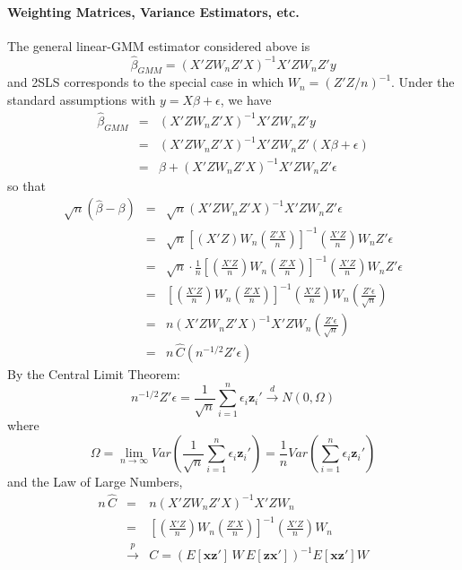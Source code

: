 \documentclass[12pt]{article}
\theoremstyle{definition}
\begin{document}
\paragraph{Weighting Matrices, Variance Estimators, etc.}
The general linear-GMM estimator considered above is 
  $$\widehat{\beta}_{GMM} = (X'Z W_n Z'X)^{-1}X'Z W_n Z'y$$
and 2SLS corresponds to the special case in which $W_n = (Z'Z/n)^{-1}$. Under the standard assumptions with $y = X\beta + \epsilon$, we have
\begin{eqnarray*}
  \widehat{\beta}_{GMM} &=& (X'Z W_n Z'X)^{-1}X'Z W_n Z'y\\
      &=& (X'Z W_n Z'X)^{-1}X'Z W_n Z'(X\beta + \epsilon)\\
      &=&\beta + (X'Z W_n Z'X)^{-1}X'Z W_n Z'\epsilon
\end{eqnarray*}
so that 
\begin{eqnarray*}
  \sqrt{n} \left(\widehat{\beta} - \beta\right) &=& \sqrt{n} (X'Z W_n Z'X)^{-1}X'Z W_n Z'\epsilon\\
    &=& \sqrt{n} \left[\left(X'Z\right) W_n \left(\frac{Z'X}{n} \right) \right]^{-1} \left(\frac{X'Z}{n} \right) W_n Z'\epsilon\\
    &=& \sqrt{n} \cdot \frac{1}{n} \left[\left(\frac{X'Z}{n}\right) W_n \left(\frac{Z'X}{n} \right) \right]^{-1} \left(\frac{X'Z}{n} \right)W_n Z'\epsilon\\
    &=& \left[\left(\frac{X'Z}{n}\right) W_n \left(\frac{Z'X}{n} \right) \right]^{-1} \left(\frac{X'Z}{n} \right)W_n\left(\frac{Z'\epsilon}{\sqrt{n}}\right)\\
    &=& n \left(X'Z W_n Z'X\right)^{-1} X'Z W_n\left(\frac{Z'\epsilon}{\sqrt{n}}\right) \\
    &=& n\,\widehat{C}\left( n^{-1/2} Z'\epsilon\right)
\end{eqnarray*}
By the Central Limit Theorem:
  $$n^{-1/2} Z'\epsilon = \frac{1}{\sqrt{n}} \sum_{i=1}^n \epsilon_i \textbf{z}_i' \overset{d}{\rightarrow} N(0,\Omega)$$
where 
  $$\Omega = \lim_{n\rightarrow \infty} Var \left( \frac{1}{\sqrt{n}} \sum_{i=1}^n \epsilon_i \textbf{z}_i'\right) = \frac{1}{n} Var \left( \sum_{i=1}^n \epsilon_i \textbf{z}_i'\right)$$
and the Law of Large Numbers,
  \begin{eqnarray*}
    n\, \widehat{C} &=& n \left(X'Z W_n Z'X\right)^{-1} X'Z W_n\\ 
        &=& \left[\left(\frac{X'Z}{n}\right) W_n \left(\frac{Z'X}{n} \right) \right]^{-1} \left(\frac{X'Z}{n} \right)W_n\\
        &\overset{p}{\rightarrow}& C = \left( E[\mathbf{x}\mathbf{z}']\,W \,E[\mathbf{z}\mathbf{x}'] \right)^{-1} E[\mathbf{x}\mathbf{z'}] W
  \end{eqnarray*}
\end{document}
